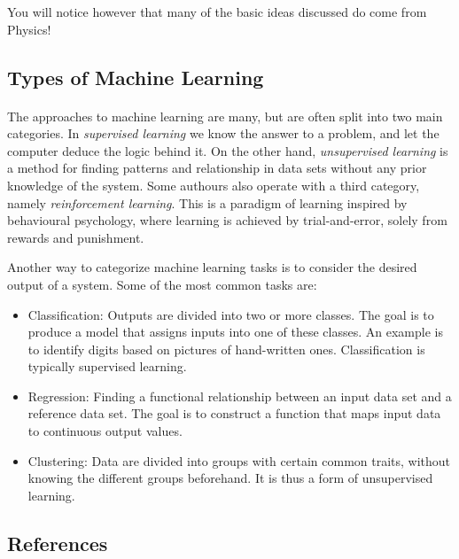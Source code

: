 \documentclass[%
oneside,                 %
final,                   %
10pt]{article}
\begin{document}
You will notice however that many of the basic ideas discussed do come from Physics!



\subsection{Types of Machine Learning}


\paragraph{}
The approaches to machine learning are many, but are often split into two main categories. 
In \emph{supervised learning} we know the answer to a problem,
and let the computer deduce the logic behind it. On the other hand, \emph{unsupervised learning}
is a method for finding patterns and relationship in data sets without any prior knowledge of the system.
Some authours also operate with a third category, namely \emph{reinforcement learning}. This is a paradigm 
of learning inspired by behavioural psychology, where learning is achieved by trial-and-error, 
solely from rewards and punishment.

Another way to categorize machine learning tasks is to consider the desired output of a system.
Some of the most common tasks are:

\begin{itemize}
  \item Classification: Outputs are divided into two or more classes. The goal is to   produce a model that assigns inputs into one of these classes. An example is to identify  digits based on pictures of hand-written ones. Classification is typically supervised learning.

  \item Regression: Finding a functional relationship between an input data set and a reference data set.   The goal is to construct a function that maps input data to continuous output values.

  \item Clustering: Data are divided into groups with certain common traits, without knowing the different groups beforehand.  It is thus a form of unsupervised learning.
\end{itemize}

\noindent




\subsection{References}
\end{document}
